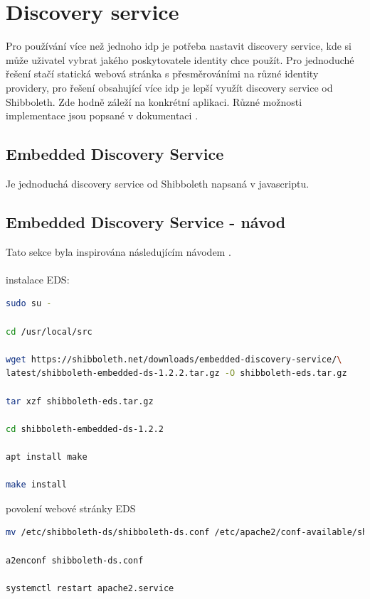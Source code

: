 \section{Discovery service}
Pro používání více než jednoho idp je potřeba nastavit discovery service, kde si může uživatel vybrat jakého poskytovatele identity chce použít. Pro jednoduché řešení stačí statická webová stránka s přesměrováními na různé identity providery, pro řešení obsahující více idp je lepší využít discovery service od Shibboleth. Zde hodně záleží na konkrétní aplikaci. Různé možnosti implementace jsou popsané v dokumentaci \cite{IdPDiscovery}.

\subsection{Embedded Discovery Service}
Je jednoduchá discovery service od Shibboleth napsaná v javascriptu. 

\subsection{Embedded Discovery Service - návod}
Tato sekce byla inspirována následujícím návodem \cite{EDS-tut}. \\ \\
instalace EDS:
\begin{lstlisting}[language=Bash]
sudo su -

cd /usr/local/src

wget https://shibboleth.net/downloads/embedded-discovery-service/\
latest/shibboleth-embedded-ds-1.2.2.tar.gz -O shibboleth-eds.tar.gz

tar xzf shibboleth-eds.tar.gz

cd shibboleth-embedded-ds-1.2.2

apt install make

make install
\end{lstlisting}

povolení webové stránky EDS

\begin{lstlisting}[language=Bash]
mv /etc/shibboleth-ds/shibboleth-ds.conf /etc/apache2/conf-available/shibboleth-ds.conf

a2enconf shibboleth-ds.conf

systemctl restart apache2.service
\end{lstlisting}

